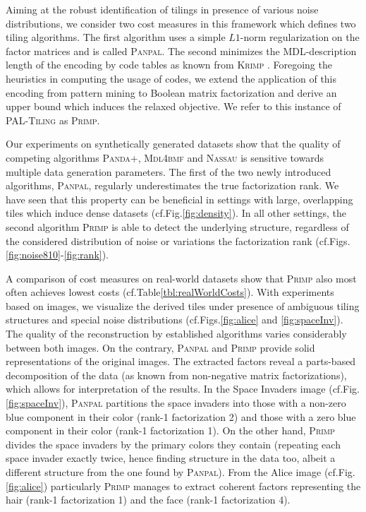 Aiming at the robust identification of tilings in presence of various noise distributions, we consider two cost measures in this framework which defines two tiling algorithms. The first algorithm uses a simple $L1$-norm regularization on the factor matrices and is called \textsc{Panpal}. The second minimizes the MDL-description length of the encoding by code tables as known from \textsc{Krimp} \citep{siebes2006item}. Foregoing the heuristics in computing the usage of codes, we extend the application of this encoding from pattern mining to Boolean matrix factorization and derive an upper bound which induces the relaxed objective. We refer to this instance of \textsc{PAL-Tiling} as \textsc{Primp}.

Our experiments on synthetically generated datasets show  that the quality of competing algorithms \textsc{Panda+}, \textsc{Mdl4bmf} and \textsc{Nassau} is sensitive towards multiple data generation parameters. The first of the two newly introduced algorithms, \textsc{Panpal}, regularly underestimates the true factorization rank. We have seen that this property can be beneficial in settings with large, overlapping tiles which induce dense datasets (cf.\@ Fig.\@ \ref{fig:density}). In all other settings, the second algorithm \textsc{Primp} is able to detect the underlying structure, regardless of the considered distribution of noise or variations the factorization rank (cf.\@ Figs.\@ \ref{fig:noise810}-\ref{fig:rank}). 

A comparison of cost measures on real-world datasets show that \textsc{Primp} also most often achieves lowest costs (cf.\@ Table\@ \ref{tbl:realWorldCosts}). With experiments based on images, we visualize the derived tiles under  presence of ambiguous tiling structures and special noise distributions (cf.\@ Figs.\@ \ref{fig:alice} and \ref{fig:spaceInv}). The quality of the reconstruction by established algorithms varies considerably between both images. On the contrary, \textsc{Panpal} and \textsc{Primp} provide solid representations of the original images. The extracted factors reveal a parts-based decomposition of the data (as known from non-negative matrix factorizations), which allows for interpretation of the results. In the Space Invaders image (cf.\@ Fig.\@ \ref{fig:spaceInv}), \textsc{Panpal} partitions the space invaders into those with a non-zero blue component in their color (rank-1 factorization 2) and those with a zero blue component in their color (rank-1 factorization 1). On the other hand, \textsc{Primp} divides the space invaders by the primary colors they contain (repeating each space invader exactly twice, hence finding structure in the data too, albeit a different structure from the one found by \textsc{Panpal}). From the Alice image (cf.\@ Fig.\@ \ref{fig:alice}) particularly \textsc{Primp} manages to extract coherent factors representing the hair (rank-1 factorization 1) and the face (rank-1 factorization 4).

